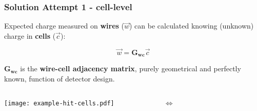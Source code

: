 \documentclass[xcolor=dvipsnames]{beamer}
\begin{document}
\begin{frame}[fragile]
  \frametitle{Solution Attempt 1 - cell-level}
  Expected charge measured on \textbf{wires} ($\vec{w}$) can be calculated
  knowing (unknown) charge in \textbf{cells} ($\vec{c}$):

  \[\vec{w} = \mathbf{G_{wc}}\vec{c}\]

  $\mathbf{G_{wc}}$ is the \textbf{wire-cell adjacency matrix}, purely
  geometrical and perfectly known, function of detector design.
  
  \begin{columns}
    \begin{column}{0.45\textwidth}
      \vspace{-5mm}

      \flushright \texttt{[image: example-hit-cells.pdf]}

    \end{column}
    \begin{column}{0.10\textwidth}
      $\Leftrightarrow$
    \end{column}
    \begin{column}{0.45\textwidth}

\end{column}
\end{columns}
\end{frame}
\end{document}
